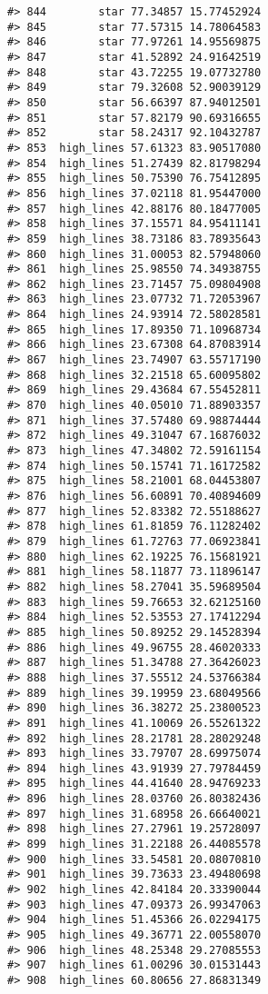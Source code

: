 \documentclass[
]{book}
\theoremstyle{definition}
\theoremstyle{definition}
\theoremstyle{definition}
\theoremstyle{definition}
\theoremstyle{remark}
\begin{document}
\begin{verbatim}
#> 844        star 77.34857 15.77452924
#> 845        star 77.57315 14.78064583
#> 846        star 77.97261 14.95569875
#> 847        star 41.52892 24.91642519
#> 848        star 43.72255 19.07732780
#> 849        star 79.32608 52.90039129
#> 850        star 56.66397 87.94012501
#> 851        star 57.82179 90.69316655
#> 852        star 58.24317 92.10432787
#> 853  high_lines 57.61323 83.90517080
#> 854  high_lines 51.27439 82.81798294
#> 855  high_lines 50.75390 76.75412895
#> 856  high_lines 37.02118 81.95447000
#> 857  high_lines 42.88176 80.18477005
#> 858  high_lines 37.15571 84.95411141
#> 859  high_lines 38.73186 83.78935643
#> 860  high_lines 31.00053 82.57948060
#> 861  high_lines 25.98550 74.34938755
#> 862  high_lines 23.71457 75.09804908
#> 863  high_lines 23.07732 71.72053967
#> 864  high_lines 24.93914 72.58028581
#> 865  high_lines 17.89350 71.10968734
#> 866  high_lines 23.67308 64.87083914
#> 867  high_lines 23.74907 63.55717190
#> 868  high_lines 32.21518 65.60095802
#> 869  high_lines 29.43684 67.55452811
#> 870  high_lines 40.05010 71.88903357
#> 871  high_lines 37.57480 69.98874444
#> 872  high_lines 49.31047 67.16876032
#> 873  high_lines 47.34802 72.59161154
#> 874  high_lines 50.15741 71.16172582
#> 875  high_lines 58.21001 68.04453807
#> 876  high_lines 56.60891 70.40894609
#> 877  high_lines 52.83382 72.55188627
#> 878  high_lines 61.81859 76.11282402
#> 879  high_lines 61.72763 77.06923841
#> 880  high_lines 62.19225 76.15681921
#> 881  high_lines 58.11877 73.11896147
#> 882  high_lines 58.27041 35.59689504
#> 883  high_lines 59.76653 32.62125160
#> 884  high_lines 52.53553 27.17412294
#> 885  high_lines 50.89252 29.14528394
#> 886  high_lines 49.96755 28.46020333
#> 887  high_lines 51.34788 27.36426023
#> 888  high_lines 37.55512 24.53766384
#> 889  high_lines 39.19959 23.68049566
#> 890  high_lines 36.38272 25.23800523
#> 891  high_lines 41.10069 26.55261322
#> 892  high_lines 28.21781 28.28029248
#> 893  high_lines 33.79707 28.69975074
#> 894  high_lines 43.91939 27.79784459
#> 895  high_lines 44.41640 28.94769233
#> 896  high_lines 28.03760 26.80382436
#> 897  high_lines 31.68958 26.66640021
#> 898  high_lines 27.27961 19.25728097
#> 899  high_lines 31.22188 26.44085578
#> 900  high_lines 33.54581 20.08070810
#> 901  high_lines 39.73633 23.49480698
#> 902  high_lines 42.84184 20.33390044
#> 903  high_lines 47.09373 26.99347063
#> 904  high_lines 51.45366 26.02294175
#> 905  high_lines 49.36771 22.00558070
#> 906  high_lines 48.25348 29.27085553
#> 907  high_lines 61.00296 30.01531443
#> 908  high_lines 60.80656 27.86831349

\end{verbatim}
\end{document}
